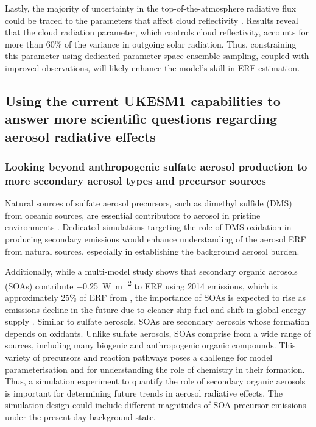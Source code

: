 Lastly, the majority of uncertainty in the top-of-the-atmosphere radiative flux could be traced to the parameters that affect cloud reflectivity \citet{regayreAerosolPhysicalAtmosphere2018}. Results reveal that the cloud radiation parameter, which controls cloud reflectivity, accounts for more than 60\% of the variance in outgoing solar radiation. Thus, constraining this parameter using dedicated parameter-space ensemble sampling, coupled with improved observations, will likely enhance the model's skill in ERF estimation.


\subsection{Using the current UKESM1 capabilities to answer more scientific questions regarding aerosol radiative effects} 

\subsubsection{Looking beyond anthropogenic sulfate aerosol production to more secondary aerosol types and precursor sources}

Natural sources of sulfate aerosol precursors, such as dimethyl sulfide (DMS) from oceanic sources, are essential contributors to aerosol in pristine environments \citep{bockEvaluationOceanDimethylsulfide2021}. Dedicated simulations targeting the role of DMS oxidation in producing secondary  emissions would enhance understanding of the aerosol ERF from natural sources, especially in establishing the background aerosol burden.

Additionally, while a multi-model study shows that secondary organic aerosols (SOAs) contribute \qty{-0.25}{W~m^{-2}} to ERF using 2014 emissions, which is approximately 25\% of ERF from  \citep[][]{thornhillEffectiveRadiativeForcing2021}, the importance of SOAs is expected to rise as  emissions decline in the future due to cleaner ship fuel and shift in global energy supply \citep[][]{mcduffieGlobalAnthropogenicEmission2020,yoshiokaWarmingEffectsReduced2024}. Similar to sulfate aerosols, SOAs are secondary aerosols whose formation depends on oxidants. Unlike sulfate aerosols, SOAs comprise from a wide range of sources, including many biogenic and anthropogenic organic compounds. This variety of precursors and reaction pathways poses a challenge for model parameterisation and for understanding the role of chemistry in their formation. Thus, a simulation experiment to quantify the role of secondary organic aerosols is important for determining future trends in aerosol radiative effects. The simulation design could include different magnitudes of SOA precursor emissions under the present-day background state.


